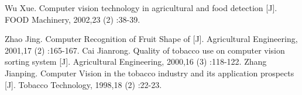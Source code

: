 \documentclass{article}
\begin{document}
	
	
	
	
	
	\begin{thebibliography}{99}
		    Wu Xue. Computer vision technology in agricultural and food detection [J]. FOOD Machinery, 2002,23 (2) :38-39.
		
		   Zhao Jing. Computer Recognition of Fruit Shape of [J]. Agricultural Engineering, 2001,17 (2) :165-167. 
        	 Cai Jianrong. Quality of tobacco use on computer vision sorting system [J]. Agricultural Engineering, 2000,16 (3) :118-122. 
		   Zhang Jianping. Computer Vision in the tobacco industry and its application prospects [J]. Tobacco Technology, 1998,18 (2) :22-23.
	\end{thebibliography}
\end{document}
